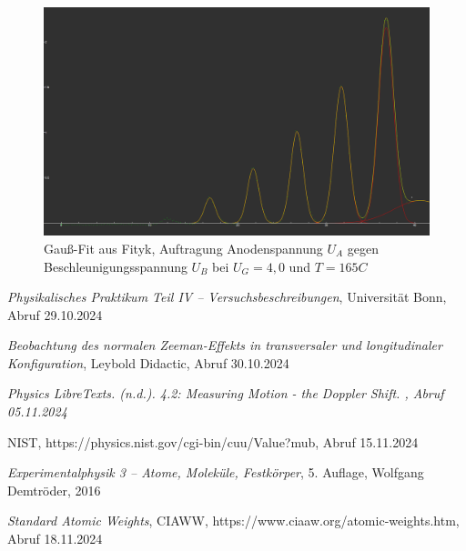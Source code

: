 \documentclass{article}
\begin{document}
\begin{figure}[H]
  \centering
  \includegraphics[scale=0.2]{FH_4,0V_165C.png}
  \caption{Gauß-Fit aus Fityk, Auftragung Anodenspannung $U_A$ gegen Beschleunigungsspannung $U_B$ bei $U_G=4,0$ und $T=165C$}
  \label{FH 4,0V_165C}
\end{figure}
\newpage
\begin{thebibliography}{9}

\textit{Physikalisches Praktikum Teil IV -- Versuchsbeschreibungen}, Universität Bonn, Abruf 29.10.2024

\textit{Beobachtung des normalen Zeeman-Effekts in transversaler und longitudinaler Konfiguration}, Leybold Didactic, Abruf 30.10.2024

\textit{Physics LibreTexts. (n.d.). 4.2: Measuring Motion - the Doppler Shift. , Abruf 05.11.2024}
\label{einheit}

NIST, https://physics.nist.gov/cgi-bin/cuu/Value?mub, Abruf 15.11.2024

\textit{Experimentalphysik 3 -- Atome, Moleküle, Festkörper}, 5. Auflage, Wolfgang Demtröder, 2016

\textit{Standard Atomic Weights}, CIAWW, https://www.ciaaw.org/atomic-weights.htm, Abruf 18.11.2024

\end{thebibliography}
\end{document}
